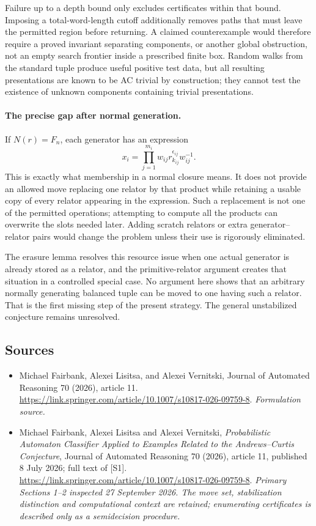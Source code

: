 \documentclass[11pt]{article}
\begin{document}
Failure up to a depth bound only excludes certificates within that
bound. Imposing a total-word-length cutoff additionally removes paths
that must leave the permitted region before returning. A claimed
counterexample would therefore require a proved invariant separating
components, or another global obstruction, not an empty search frontier
inside a prescribed finite box. Random walks from the standard tuple
produce useful positive test data, but all resulting presentations are
known to be AC trivial by construction; they cannot test the existence
of unknown components containing trivial presentations.

\paragraph{The precise gap after normal generation.}
If $N(r)=F_n$, each generator has an expression
\[
 x_i=\prod_{j=1}^{m_i}w_{ij}r_{k_{ij}}^{\epsilon_{ij}}w_{ij}^{-1}.
\]
This is exactly what membership in a normal closure means. It does
not provide an allowed move replacing one relator by that product
while retaining a usable copy of every relator appearing in the
expression. Such a replacement is not one of the permitted operations;
attempting to compute all the products can overwrite the slots needed
later. Adding scratch relators or extra generator--relator pairs would
change the problem unless their use is rigorously eliminated.

The erasure lemma resolves this resource issue when one actual generator
is already stored as a relator, and the primitive-relator argument
creates that situation in a controlled special case. No argument here
shows that an arbitrary normally generating balanced tuple can be moved
to one having such a relator. That is the first missing step of the
present strategy. The general unstabilized conjecture remains unresolved.

\subsection{Sources}
\begin{itemize}
\item[S1]Michael Fairbank, Alexei Lisitsa, and Alexei Vernitski, Journal of Automated Reasoning 70 (2026), article 11.
\url{https://link.springer.com/article/10.1007/s10817-026-09759-8}.
\textit{Formulation source.}
\item[E1]Michael Fairbank, Alexei Lisitsa and Alexei Vernitski,
\emph{Probabilistic Automaton Classifier Applied to Examples Related
to the Andrews--Curtis Conjecture}, Journal of Automated Reasoning
70 (2026), article 11, published 8 July 2026; full text of [S1].
\url{https://link.springer.com/article/10.1007/s10817-026-09759-8}.
\textit{Primary Sections 1--2 inspected 27 September 2026. The move
set, stabilization distinction and computational context are retained;
enumerating certificates is described only as a semidecision procedure.}
\end{itemize}
\end{document}
